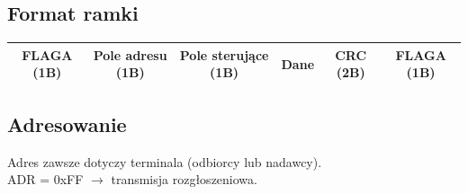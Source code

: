 \documentclass[a4paper,twoside]{article}
\begin{document}
\subsection{Format ramki}
\begin{table}[h]
	\begin{tabular}{|c|c|c|c|c|c|}
		\hline
		FLAGA (1B)	&	Pole adresu (1B)	&	Pole sterujące (1B)	&	Dane	&	CRC (2B)	& FLAGA (1B)	\\ \hline
	\end{tabular}
\end{table}
\subsection{Adresowanie}
Adres zawsze dotyczy terminala (odbiorcy lub nadawcy).\\
ADR = 0xFF $ \longrightarrow $ transmisja rozgłoszeniowa.
\end{document}
